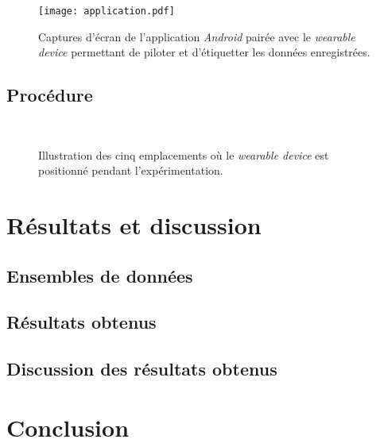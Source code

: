 \begin{figure}[H]
	\centering
	\texttt{[image: application.pdf]}
        \caption{Captures d'écran de l'application \textit{Android} pairée avec le \textit{wearable device} permettant de piloter et d'étiquetter les données enregistrées.}
	\label{fig:application}
\end{figure}

\subsection{Procédure}

\begin{figure}[H]
    \centering
    \\[30pt]
    \caption{Illustration des cinq emplacements où le \textit{wearable device} est positionné pendant l'expérimentation.}
    \label{fig:positions}
\end{figure}

\section{Résultats et discussion}

\subsection{Ensembles de données}

\subsection{Résultats obtenus}

\subsection{Discussion des résultats obtenus}

\section{Conclusion}